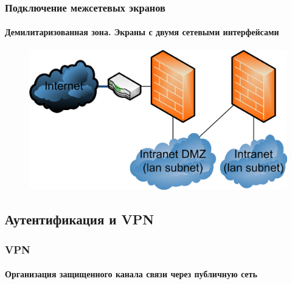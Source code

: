 \begin{frame}
    \frametitle{Подключение межсетевых экранов}
    \framesubtitle{Демилитаризованная зона. Экраны с двумя сетевыми интерфейсами}
    
    \begin{figure}
        \includegraphics[width=.9\textwidth]{fig/fwalldmzlan}\\
    \end{figure}
\end{frame}


\subsection{Аутентификация и VPN}

\begin{frame}
    \frametitle{VPN}
    \framesubtitle{Организация защищенного канала связи через публичную сеть}
    
    \begin{figure}
    \end{figure}
\end{frame}

